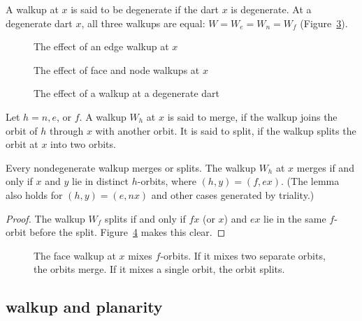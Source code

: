 A walkup at $x$ is said to be degenerate 
if the dart $x$ is degenerate.   
At a degenerate dart $x$, all three walkups
are equal: $W=W_e=W_n=W_f$ (Figure~\ref{fig:walkdeg}).

\begin{figure}[htb]
  \centering
  \caption{The effect of an edge walkup at $x$}
  \label{fig:walk}
\end{figure}

\begin{figure}[htb]
  \centering
  \caption{The effect of face and node walkups at $x$}
  \label{fig:walkfn}
\end{figure}

\begin{figure}[htb]
  \centering
  \caption{The effect of a walkup at a degenerate dart}
  \label{fig:walkdeg}
\end{figure}


\begin{definition} Let $h=n,e$, or $f$.
A walkup $W_h$ at $x$ is said to merge,
if the walkup joins the orbit of $h$ through $x$ with another orbit.  
It is said to split, if the walkup splits the
orbit at $x$ into two orbits.
\end{definition}

\begin{lemma} 
Every nondegenerate walkup merges or splits.
The walkup $W_h$ at $x$ merges if and only if $x$ and $y$  lie
in distinct $h$-orbits, where $(h,y)=(f,e x)$.  
(The lemma also holds for $(h,y)=(e,n x)$ and other cases generated
by triality.)
\end{lemma}

\begin{proof} The walkup $W_f$ splits if and only if $f x$ 
(or $x$)
and $e x$ lie in the same $f$-orbit before the split. 
Figure~\ref{fig:split} makes this clear.
\end{proof}


\begin{figure}[htb]
  \centering
  \caption{The face walkup at $x$ mixes $f$-orbits.  If it mixes
  two separate 
  orbits, the orbits merge.  If it mixes a single orbit, 
  the orbit splits.}
  \label{fig:split}
\end{figure}


\subsection{walkup and planarity}

